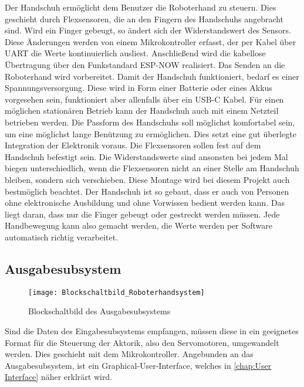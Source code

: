 \documentclass[titlepage,12pt,twoside]{article}
\begin{document}
Der Handschuh ermöglicht dem Benutzer die Roboterhand zu steuern. Dies geschieht 
durch Flexsensoren, die an den Fingern des Handschuhs angebracht sind. Wird ein 
Finger gebeugt, so ändert sich der Widerstandswert des Sensors. Diese Änderungen 
werden von einem Mikrokontroller erfasst, der per Kabel über UART die Werte 
kontinuierlich ausliest. Anschließend wird die kabellose Übertragung über den 
Funkstandard ESP-NOW realisiert. Das Senden an die Roboterhand wird vorbereitet. 
Damit der Handschuh funktioniert, bedarf es einer Spannungsversorgung. Diese wird 
in Form einer Batterie oder eines Akkus vorgesehen sein, funktioniert aber allenfalls 
über ein USB-C Kabel. Für einen möglichen stationären Betrieb kann der Handschuh 
auch mit einem Netzteil betrieben werden. Die Passform des Handschuhs soll 
möglichst komfortabel sein, um eine möglichst lange Benützung zu ermöglichen. 
Dies setzt eine gut überlegte Integration der Elektronik voraus. Die Flexsensoren 
sollen fest auf dem Handschuh befestigt sein. Die Widerstandswerte sind ansonsten 
bei jedem Mal biegen unterschiedlich, wenn die Flexsensoren nicht an einer Stelle 
am Handschuh bleiben, sondern sich verschieben. Diese Montage wird bei diesem 
Projekt auch bestmöglich beachtet. Der Handschuh ist so gebaut, dass er auch von 
Personen ohne elektronische Ausbildung und ohne Vorwissen bedient werden kann. 
Das liegt daran, dass nur die Finger gebeugt oder gestreckt werden müssen. Jede 
Handbewegung kann also gemacht werden, die Werte werden per Software automatisch 
richtig verarbeitet. \\

\subsection{Ausgabesubsystem}
\label{chap:Ausgabesubsystem}

\begin{figure}[H]
	\begin{center}
		\scalebox{0.8}
		{\texttt{[image: Blockschaltbild\_Roboterhandsystem]}}
		\caption{Blockschaltbild des Ausgabesubsystems}
		\label{fig:Blockschaltbild_Roboterhandsystem}		
	\end{center}
\end{figure}

Sind die Daten des Eingabesubsystems empfangen, müssen diese in ein geeignetes Format für die Steuerung der Aktorik, also den Servomotoren,
umgewandelt werden. Dies geschieht mit dem Mikrokontroller. Angebunden an das Ausgabesubsystem, ist ein Graphical-User-Interface, 
welches in \autoref{chap:User Interface} näher erklrärt wird. \\
\end{document}
